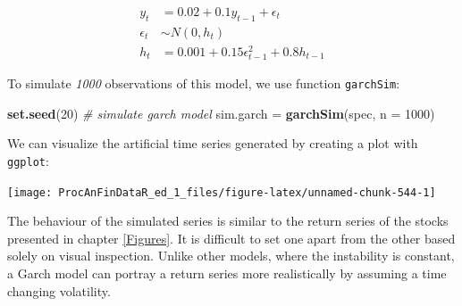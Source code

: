 \documentclass[11pt,]{book}
\newenvironment{Shaded}{\begin{snugshade}}{\end{snugshade}}
\newcommand{\KeywordTok}[1]{\textcolor[rgb]{0.27,0.27,0.27}{\textbf{#1}}}
\newcommand{\DataTypeTok}[1]{\textcolor[rgb]{0.27,0.27,0.27}{#1}}
\newcommand{\DecValTok}[1]{\textcolor[rgb]{0.06,0.06,0.06}{#1}}
\newcommand{\StringTok}[1]{\textcolor[rgb]{0.5,0.5,0.5}{#1}}
\newcommand{\CommentTok}[1]{\textcolor[rgb]{0.56,0.35,0.01}{\textit{#1}}}
\newcommand{\OperatorTok}[1]{\textcolor[rgb]{0.81,0.36,0.00}{\textbf{#1}}}
\newcommand{\NormalTok}[1]{#1}
\begin{document}
\[\begin{aligned} y _t &=  0.02 + 0.1 y_{t-1} + \epsilon _t \\\epsilon _t &\sim N \left(0, h _t \right ) \\h _t &= 0.001 + 0.15 \epsilon ^2 _{t-1}+ 0.8 h_{t-1} \end{aligned} \]

To simulate \emph{1000} observations of this model, we use function
\texttt{garchSim}:

\begin{Shaded}
\begin{Highlighting}[]
\KeywordTok{set.seed}\NormalTok{(}\DecValTok{20}\NormalTok{)}
\CommentTok{# simulate garch model}
\NormalTok{sim.garch =}\StringTok{ }\KeywordTok{garchSim}\NormalTok{(spec, }\DataTypeTok{n =} \DecValTok{1000}\NormalTok{)}
\end{Highlighting}
\end{Shaded}

We can visualize the artificial time series generated by creating a plot
with \texttt{ggplot}:

\begin{Shaded}
\end{Shaded}

\begin{center}\texttt{[image: ProcAnFinDataR\_ed\_1\_files/figure-latex/unnamed-chunk-544-1]} \end{center}

The behaviour of the simulated series is similar to the return series of
the stocks presented in chapter \ref{Figures}. It is difficult to set
one apart from the other based solely on visual inspection. Unlike other
models, where the instability is constant, a Garch model can portray a
return series more realistically by assuming a time changing volatility.
\end{document}
